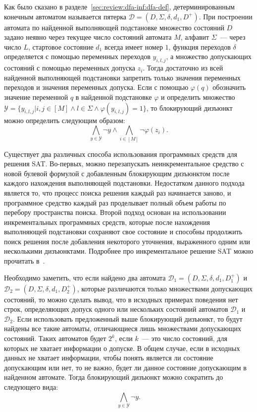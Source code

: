 Как было сказано в разделе~\ref{sec:review:dfa-inf:dfa-def}, детерминированным конечным автоматом называется пятерка $\mathcal{D} = \left(D,\Sigma,\delta,d_{1},D^{+}\right)$.
При построении автомата по найденной выполняющей подстановке множество состояний $D$ задано неявно через текущее число состояний автомата $M$, алфавит $\Sigma$~{---} через число $L$, стартовое состояние $d_{1}$ всегда имеет номер $1$, функция переходов $\delta$ определяется с помощью переменных переходов $y_{i,l,j}$, а множество допускающих состояний с помощью переменных допуска $z_{i}$.
Тогда достаточно из всей найденной выполняющей подстановки запретить только значения переменных переходов и значения переменных допуска.
Если с помощью $\varphi\left(q\right)$ обозначить значение переменной $q$ в найденной подстановке $\varphi$ и определить множество $\mathcal{Y} = \{y_{i,l,j} | i,j \in \left[M\right] \wedge l \in \Sigma \wedge \varphi\left(y_{i,l,j}\right) = 1\}$, то блокирующий дизъюнкт можно определить следующим образом:
\begin{equation*}
\bigwedge_{y \in \mathcal{Y}} \neg y \wedge \bigwedge_{i \in \left[M\right]}\neg \varphi\left(z_{i}\right).
\end{equation*}


Существует два различных способа использования программных средств для решения SAT.
Во-первых, можно перезапускать неинкрементальное средство с новой булевой формулой с добавленным блокирующим дизъюнктом после каждого нахождения выполняющей подстановки.
Недостатком данного подхода является то, что процесс поиска решения каждый раз начинается заново, и программное средство каждый раз проделывает полный объем работы по перебору пространства поиска.
Второй подход основан на использовании инкрементальных программных средств, которые после нахождения выполняющей подстановки сохраняют свое состояние и способны продолжить поиск решения после добавления некоторого уточнения, выраженного одним или несколькими дизъюнктами.
Подробнее про инкрементальное решение SAT можно прочитать в~\cite{DBLP:conf/sat/EenS03}.


Необходимо заметить, что если найдено два автомата $\mathcal{D}_1 = \left(D,\Sigma,\delta,d_{1},D_{1}^{+}\right)$ и $\mathcal{D}_2 = \left(D,\Sigma,\delta,d_{1},D_{2}^{+}\right)$, которые различаются только множествами допускающих состояний, то можно сделать вывод, что в исходных примерах поведения нет строк, определяющих допуск одного или нескольких состояний автоматов $\mathcal{D}_{1}$ и $\mathcal{D}_{2}$.
Если использовать предложенный выше блокирующий дизъюнкт, то будут найдены все такие автоматы, отличающиеся лишь множествами допускающих состояний.
Таких автоматов будет $2^{k}$, если $k$~{---} это число состояний, для которых не хватает информации о допуске.
В общем случае, если в исходных данных не хватает информации, чтобы понять является ли состояние допускающим или нет, то не важно, будет ли данное состояние допускающим в найденном автомате.
Тогда блокирующий дизъюнкт можно сократить до следующего вида:
\begin{equation*}
\bigwedge_{y \in \mathcal{Y}} \neg y.
\end{equation*}


